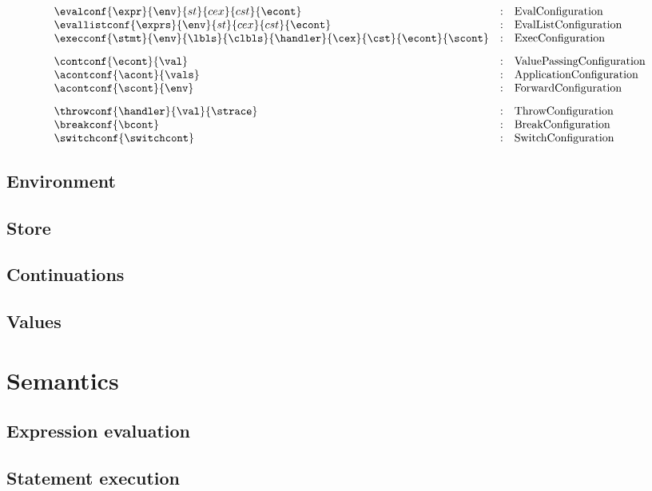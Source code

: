 \documentclass{article}
\begin{document}
\[
\begin{array}{lcl}
\evalconf{\expr}{\env}{st}{cex}{cst}{\econt} & : &
\textrm{EvalConfiguration}\\

\evallistconf{\exprs}{\env}{st}{cex}{cst}{\econt} & : & 
\textrm{EvalListConfiguration} \\

\execconf{\stmt}{\env}{\lbls}{\clbls}{\handler}{\cex}{\cst}{\econt}{\scont}  & : & 
\textrm{ExecConfiguration}\\[3mm]

\contconf{\econt}{\val} & : & 
\textrm{ValuePassingConfiguration} \\

\acontconf{\acont}{\vals}& : & 
\textrm{ApplicationConfiguration} \\

\acontconf{\scont}{\env} & : & 
\textrm{ForwardConfiguration} \\[3mm]

\throwconf{\handler}{\val}{\strace} & : & 
\textrm{ThrowConfiguration} \\

\breakconf{\bcont} & : & 
\textrm{BreakConfiguration} \\

\switchconf{\switchcont} & : & 
 \textrm{SwitchConfiguration}\\

\end{array}
\]
\subsection{Environment}
\subsection{Store}
\subsection{Continuations}

\subsection{Values}
\section{Semantics}
\subsection{Expression evaluation}
\subsection{Statement execution}
\end{document}
